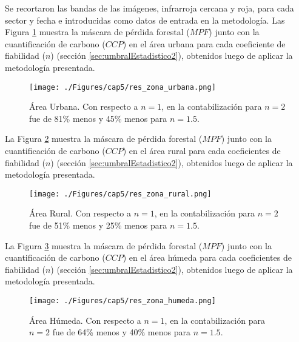 Se recortaron las bandas de las im\'agenes, infrarroja cercana y roja, para cada sector y fecha e introducidas como datos de entrada en la metodolog\'ia. Las Figura \ref{fig:ubana} muestra la m\'ascara de p\'erdida forestal ($ MPF $) junto con la cuantificaci\'on de carbono ($ CCP $) en el \'area urbana para cada coeficiente de fiabilidad ($ n $) (secci\'on \ref{sec:umbralEstadistico2}), obtenidos luego de aplicar la metodolog\'ia presentada.
\begin{figure}[H]
	\centering
	\texttt{[image: ./Figures/cap5/res\_zona\_urbana.png]}
	\caption{\'Area Urbana. Con respecto a $ n=1 $, en la contabilizaci\'on para $ n=2 $ fue de 81\% menos y 45\% menos para $ n=1.5 $.}
	\label{fig:ubana}
\end{figure}
La Figura \ref{fig:rural} muestra la m\'ascara de p\'erdida forestal ($ MPF $) junto con la cuantificaci\'on de carbono ($ CCP $) en el \'area rural para cada coeficientes de fiabilidad ($ n $) (secci\'on \ref{sec:umbralEstadistico2}), obtenidos luego de aplicar la metodolog\'ia presentada. 
\begin{figure}[H]
	\centering
	\texttt{[image: ./Figures/cap5/res\_zona\_rural.png]}
	\caption{\'Area Rural. Con respecto a $ n=1 $, en la contabilizaci\'on para $ n=2 $ fue de 51\% menos y 25\% menos para $ n=1.5 $.}
	\label{fig:rural}
\end{figure}
La Figura \ref{fig:humeda} muestra la m\'ascara de p\'erdida forestal ($ MPF $) junto con la cuantificaci\'on de carbono ($ CCP $) en el \'area h\'umeda para cada coeficientes de fiabilidad ($ n $) (secci\'on \ref{sec:umbralEstadistico2}), obtenidos luego de aplicar la metodolog\'ia presentada.
\begin{figure}[H]
	\centering
	\texttt{[image: ./Figures/cap5/res\_zona\_humeda.png]}
	\caption{\'Area H\'umeda. Con respecto a $ n=1 $, en la contabilizaci\'on para $ n=2 $ fue de 64\% menos y 40\% menos para $ n=1.5 $.}
	\label{fig:humeda}
\end{figure}


